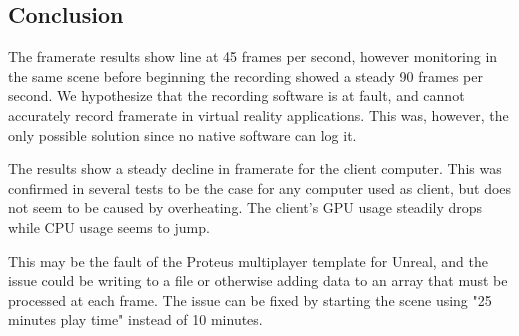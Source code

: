 \subsection*{Conclusion}
The framerate results show line at 45 frames per second, however monitoring in the same scene before beginning the recording showed a steady 90 frames per second. We hypothesize that the recording software is at fault, and cannot accurately record framerate in virtual reality applications. This was, however, the only possible solution since no native software can log it. 

The results show a steady decline in framerate for the client computer. This was confirmed in several tests to be the case for any computer used as client, but does not seem to be caused by overheating. The client's GPU usage steadily drops while CPU usage seems to jump. 

This may be the fault of the Proteus multiplayer template for Unreal, and the issue could be writing to a file or otherwise adding data to an array that must be processed at each frame. The issue can be fixed by starting the scene using "25 minutes play time" instead of 10 minutes.
